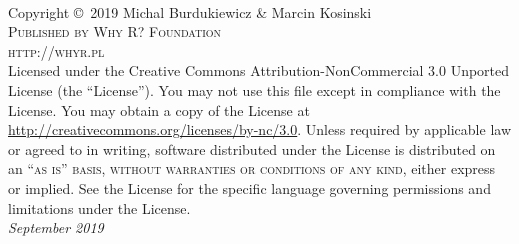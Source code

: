 \frontmatter

\maketitle

\newpage
~\vfill
\thispagestyle{empty}

\noindent Copyright \copyright\ 2019 Michal Burdukiewicz \& Marcin Kosinski\\ %

\noindent \textsc{Published by Why R? Foundation}\\ %

\noindent \textsc{http://whyr.pl}\\ %

\noindent Licensed under the Creative Commons Attribution-NonCommercial 3.0 Unported License (the ``License''). You may not use this file except in compliance with the License. You may obtain a copy of the License at \url{http://creativecommons.org/licenses/by-nc/3.0}. Unless required by applicable law or agreed to in writing, software distributed under the License is distributed on an \textsc{``as is'' basis, without warranties or conditions of any kind}, either express or implied. See the License for the specific language governing permissions and limitations under the License.\\ %

\noindent \textit{September 2019}

\mainmatter
